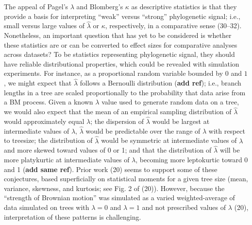 \documentclass[9pt,twocolumn,twoside,lineno]{pnas-new}
\begin{document}
The appeal of Pagel's \(\lambda\) and Blomberg's \(\kappa\) as
descriptive statistics is that they provide a basis for interpreting
``weak'' versus ``strong'' phylogenetic signal; i.e., small versus large
values of \(\hat{\lambda}\) or \(\kappa\), respectively, in a
comparative sense (30--32). Nonetheless, an important question that has
yet to be considered is whether these statistics are or can be converted
to effect sizes for comparative analyses across datasets? To be
statistics representing phylogenetic signal, they should have reliable
distributional properties, which could be revealed with simulation
experiments. For instance, as a proportional random variable bounded by
\(0\) and \(1\), we might expect that \(\hat{\lambda}\) follows a
Bernoulli distribution (\textbf{add ref}); i.e., branch lengths in a
tree are scaled proportionally to the probability that data arise from a
BM process. Given a known \(\lambda\) value used to generate random data
on a tree, we would also expect that the mean of an empirical sampling
distribution of \(\hat{\lambda}\) would approximately equal \(\lambda\);
the dispersion of \(\hat{\lambda}\) would be largest at intermediate
values of \(\lambda\), \(\hat{\lambda}\) would be predictable over the
range of \(\lambda\) with respect to treesize; the distribution of
\(\hat{\lambda}\) would be symmetric at intermediate values of
\(\lambda\) and more skewed toward values of 0 or 1; and that the
distribution of \(\hat{\lambda}\) will be more platykurtic at
intermediate values of \(\lambda\), becoming more leptokurtic toward 0
and 1 (\textbf{add same ref}). Prior work (20) seems to support some of
these conjectures, based superficially on statistical moments for a
given tree size (mean, variance, skewness, and kurtosis; see Fig. 2 of
(20)). However, because the ``strength of Brownian motion'' was
simulated as a varied weighted-average of data simulated on trees with
\(\lambda=0\) and \(\lambda=1\) and not prescribed values of \(\lambda\)
(20), interpretation of these patterns is challenging.
\end{document}
